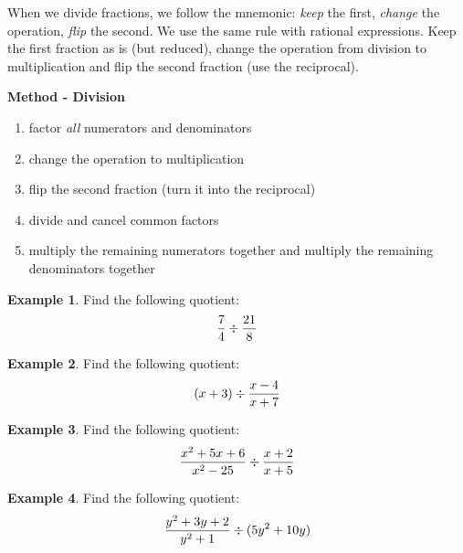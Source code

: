 \documentclass[addpoints,12pt]{exam}
\theoremstyle{definition}
\newtheorem{example}{Example}[subsection]
\begin{document}
\noindent When we divide fractions, we follow the mnemonic: \emph{keep} the first, \emph{change} the operation, \emph{flip} the second. We use the same rule with rational expressions. Keep the first fraction as is (but reduced), change the operation from division to multiplication and flip the second fraction (use the reciprocal).

\vspace{.25in}

\begin{mdframed}
\textbf{Method - Division}
\begin{enumerate}
\item factor \emph{all} numerators and denominators
\item change the operation to multiplication
\item flip the second fraction (turn it into the reciprocal)
\item divide and cancel common factors
\item multiply the remaining numerators together and multiply the remaining denominators together
\end{enumerate}
\end{mdframed}

\vspace{.25in}

\begin{example}
Find the following quotient: \[\dfrac{7}{4}\divisionsymbol\dfrac{21}{8}\]
\vspace{.75in}
\end{example}

\begin{example}
Find the following quotient: \[(x+3)\divisionsymbol\dfrac{x-4}{x+7}\]
\vspace{1.5in}
\end{example}

\begin{example}
Find the following quotient: \[\dfrac{x^2+5x+6}{x^2-25}\divisionsymbol\dfrac{x+2}{x+5}\]
\vspace{1.5in}
\end{example}

\begin{example}
Find the following quotient: \[\dfrac{y^2+3y+2}{y^2+1}\divisionsymbol(5y^2+10y)\]
\end{example}
\end{document}
